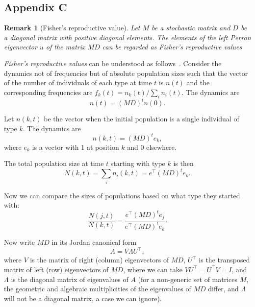 \documentclass[9pt, a4paper, twocolumn]{extarticle}
\newcommand*{\tr}{^\intercal}
\newtheorem{remark}{Remark}
\begin{document}
\subsection*{Appendix C}\label{sec:AppC}
\begin{remark}[Fisher's reproductive value]
Let $M$ be a stochastic matrix and $D$ be a diagonal matrix with positive diagonal elements. 
The elements of the left \emph{Perron} eigenvector $u$ of the matrix $MD$ can be regarded as \emph{Fisher's reproductive values}~\citep[pg.~27]{Fisher1930}
\end{remark}

\emph{Fisher's reproductive values} can be understood as follows~\citep{Grafen2006}.
Consider the dynamics not of frequencies but of absolute population sizes such that the vector of the number of individuals of each type at time $t$ is $n(t)$ and the corresponding frequencies are $f_k(t) = n_k(t) / \sum_i{n_i(t)}$.
The dynamics are
\begin{equation}
n(t) = (MD)^t n(0).
\end{equation}

Let $n(k, t)$ be the vector when the initial population is a single individual of type $k$.
The dynamics are
\begin{equation}
n(k,t) = (MD)^t e_k,
\end{equation}
where $e_k$ is a vector with 1 at position $k$ and 0 elsewhere.

The total population size at time $t$ starting with type $k$ is then
\begin{equation}
N(k,t) = \sum_i{n_i(k,t)} = e\tr (MD)^t e_k.
\end{equation}

Now we can compare the sizes of populations based on what type they started
with:
\begin{equation}
\frac{N(j,t)}{N(k,t)} = \frac{e\tr (MD)^t e_j}{e\tr (MD)^t e_k}.
\end{equation}

Now write $MD$ in its Jordan canonical form 
\begin{equation}
A = V \Lambda U\tr,
\end{equation}
where $V$ is the matrix of right (column) eigenvectors of $MD$,
$U\tr$ is the transposed matrix of left (row) eigenvectors of $MD$,
where we can take $V U\tr = U\tr V = I$, 
and $\Lambda$ is the diagonal matrix of eigenvalues of $A$ 
(for a non-generic set of matrices $M$, the geometric and algebraic multiplicities of the eigenvalues of $MD$ differ, and $\Lambda$ will not be a diagonal matrix, a case we can ignore).
\end{document}
